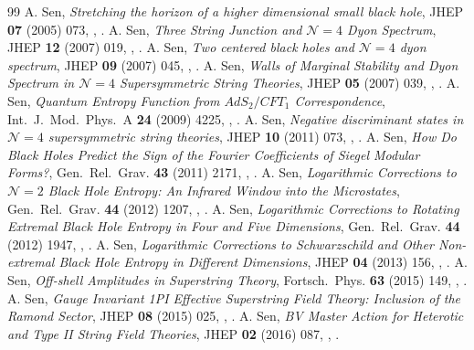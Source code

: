 \begin{thebibliography}{99}
 A. Sen, \emph{Stretching the horizon of a higher dimensional small black hole}, JHEP \textbf{07} (2005) 073, , .
 A. Sen, \emph{Three String Junction and $\mathcal N=4$ Dyon Spectrum}, JHEP \textbf{12} (2007) 019, , .
 A. Sen, \emph{Two centered black holes and $\mathcal N=4$ dyon spectrum}, JHEP \textbf{09} (2007) 045, , .
 A. Sen, \emph{Walls of Marginal Stability and Dyon Spectrum in $\mathcal N=4$ Supersymmetric String Theories}, JHEP \textbf{05} (2007) 039, , .
 A. Sen, \emph{Quantum Entropy Function from $AdS_2/CFT_1$ Correspondence}, Int.\ J.\ Mod.\ Phys.\ A \textbf{24} (2009) 4225, , .
 A. Sen, \emph{Negative discriminant states in $\mathcal N=4$ supersymmetric string theories}, JHEP \textbf{10} (2011) 073, , .
 A. Sen, \emph{How Do Black Holes Predict the Sign of the Fourier Coefficients of Siegel Modular Forms?}, Gen.\ Rel.\ Grav. \textbf{43} (2011) 2171, , .
 A. Sen, \emph{Logarithmic Corrections to $\mathcal N=2$ Black Hole Entropy: An Infrared Window into the Microstates}, Gen.\ Rel.\ Grav. \textbf{44} (2012) 1207, , .
 A. Sen, \emph{Logarithmic Corrections to Rotating Extremal Black Hole Entropy in Four and Five Dimensions}, Gen.\ Rel.\ Grav. \textbf{44} (2012) 1947, , .
 A. Sen, \emph{Logarithmic Corrections to Schwarzschild and Other Non-extremal Black Hole Entropy in Different Dimensions}, JHEP \textbf{04} (2013) 156, , .
 A. Sen, \emph{Off-shell Amplitudes in Superstring Theory}, Fortsch.\ Phys. \textbf{63} (2015) 149, , .
 A. Sen, \emph{Gauge Invariant 1PI Effective Superstring Field Theory: Inclusion of the Ramond Sector}, JHEP \textbf{08} (2015) 025, , .
 A. Sen, \emph{BV Master Action for Heterotic and Type II String Field Theories}, JHEP \textbf{02} (2016) 087, , .

\end{thebibliography}
